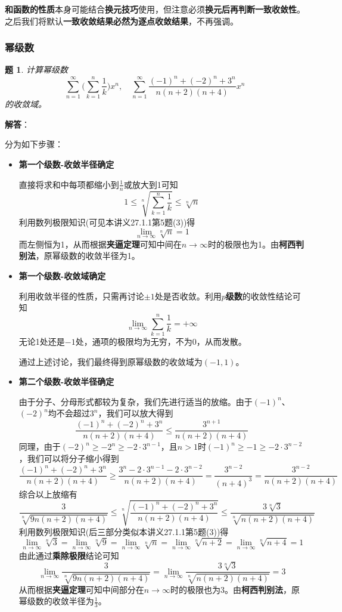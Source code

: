 \documentclass[a4paper,UTF8,fontset=windows,AutoFakeBold]{ctexart}
\newcommand*{\suminf}[1][n=1]{\sum_{#1}^\infty}
\newcommand*{\note}{\noindent *}
\theoremstyle{ex}
\newtheorem{exercise}{题}
\newcommand{\sol}[1]{{\vspace{5pt}\kaishu\noindent\textbf{解答}：\vspace{-3pt}
\begin{compactitem}
    \item[] #1
\end{compactitem}
}}
\begin{document}
\note \textbf{和函数的性质}本身可能结合\textbf{换元技巧}使用，但注意必须\textbf{换元后再判断一致收敛性}。之后我们将默认\textbf{一致收敛结果必然为逐点收敛结果}，不再强调。

\subsubsection{幂级数}
\begin{framed}
\begin{exercise}
    计算幂级数
    $$\suminf\bigg(\sum_{k=1}^n\frac{1}{k}\bigg)x^n,\quad\suminf\frac{(-1)^n+(-2)^n+3^n}{n(n+2)(n+4)}x^n$$
    的收敛域。
\end{exercise}
\sol{
    分为如下步骤：
    \begin{itemize}
        \item \textbf{第一个级数-收敛半径确定}
        
        直接将求和中每项都缩小到$\frac{1}{n}$或放大到1可知
        $$1\le\sqrt[n]{\sum_{k=1}^n\frac{1}{k}}\le\sqrt[n]{n}$$
        利用数列极限知识(可见本讲义27.1.1第5题(3))得
        $$\lim_{n\to\infty}\sqrt[n]{n}=1$$
        而左侧恒为1，从而根据\textbf{夹逼定理}可知中间在$n\to\infty$时的极限也为1。由\textbf{柯西判别法}，原幂级数的收敛半径为1。
        
        \item \textbf{第一个级数-收敛域确定}
        
        利用收敛半径的性质，只需再讨论$\pm1$处是否收敛。利用\textbf{$p$级数}的收敛性结论可知
        $$\lim_{n\to\infty}\sum_{k=1}^n\frac{1}{k}=+\infty$$
        无论1处还是$-1$处，通项的极限均为无穷，不为0，从而发散。

        通过上述讨论，我们最终得到原幂级数的收敛域为$(-1,1)$。
        
        \item \textbf{第二个级数-收敛半径确定}
        
        由于分子、分母形式都较为复杂，我们先进行适当的放缩。由于$(-1)^n$、$(-2)^n$均不会超过$3^n$，我们可以放大得到
        $$\frac{(-1)^n+(-2)^n+3^n}{n(n+2)(n+4)}\le\frac{3^{n+1}}{n(n+2)(n+4)}$$
        同理，由于$(-2)^n\ge-2^n\ge-2\cdot 3^{n-1}$，且$n>1$时$(-1)^n\ge-1\ge -2\cdot 3^{n-2}$，我们可以将分子缩小得到
        $$\frac{(-1)^n+(-2)^n+3^n}{n(n+2)(n+4)}\ge\frac{3^n-2\cdot 3^{n-1}-2\cdot 3^{n-2}}{n(n+2)(n+4)}=\frac{3^{n-2}}{(n+4)^3}=\frac{3^{n-2}}{n(n+2)(n+4)}$$
        综合以上放缩有
        $$\frac{3}{\sqrt[n]{9n(n+2)(n+4)}}\le\sqrt[n]{\frac{(-1)^n+(-2)^n+3^n}{n(n+2)(n+4)}}\le\frac{3\sqrt[n]{3}}{\sqrt[n]{n(n+2)(n+4)}}$$
        利用数列极限知识(后三部分类似本讲义27.1.1第5题(3))得
        $$\lim_{n\to\infty}\sqrt[n]{3}=\lim_{n\to\infty}\sqrt[n]{9}=\lim_{n\to\infty}\sqrt[n]{n}=\lim_{n\to\infty}\sqrt[n]{n+2}=\lim_{n\to\infty}\sqrt[n]{n+4}=1$$
        由此通过\textbf{乘除极限}结论可知
        $$\lim_{n\to\infty}\frac{3}{\sqrt[n]{9n(n+2)(n+4)}}=\lim_{n\to\infty}\frac{3\sqrt[n]{3}}{\sqrt[n]{n(n+2)(n+4)}}=3$$
        从而根据\textbf{夹逼定理}可知中间部分在$n\to\infty$时的极限也为3。由\textbf{柯西判别法}，原幂级数的收敛半径为$\frac{1}{3}$。
        

\end{itemize}}
\end{framed}
\end{document}
